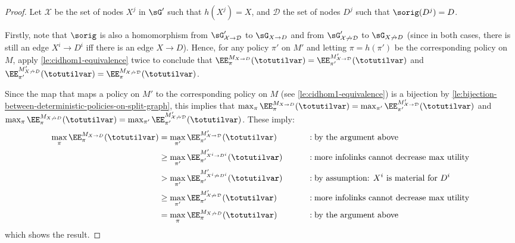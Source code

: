 \begin{proof}
\newcommand{\MatValue}[2]{\EE^{#2}_{#1}(\totutilvar)}
\newcommand{\maxMatValueExpanded}[3]{\max\limits_{#1}\MatValue{#2}{#3}}
\newcommand{\maxMatValueInlineExpanded}[3]{\max_{#1}\MatValue{#2}{#3}}
\newcommand{\maxMatValue}[2]{\maxMatValueExpanded{#1}{#1}{#2}}
\newcommand{\maxMatValueInline}[2]{\maxMatValueInlineExpanded{#1}{#1}{#2}}
Let $\mathcal X$ be the set of nodes $X^j$ in $\sG'$ such that $h(X^j)=X$, and $\mathcal D$ the set of nodes $D^j$ such that $\sorig(D^j)=D$. 

Firstly, note that $\sorig$ is also a homomorphism from  $\sG'_{\mathcal X\to \mathcal D}$ to $\sG_{X\to D}$ and from  $\sG'_{\mathcal X\not\to \mathcal D}$ to $\sG_{X\not\to D}$ (since in both cases, there is still an edge $X^i\to D^i$ iff there is an edge $X\to D$). Hence, for any policy $\pi'$ on $M'$ and letting $\pi=h(\pi')$ be the corresponding policy on $M$, apply \cref{le:cidhom1-equivalence} twice to conclude that 
$\MatValue{\pi}{M_{X\to D}}=\MatValue{\pi'}{M'_{\mathcal X\to \mathcal D}}$
and 
$\MatValue{\pi'}{M'_{X\not\to D}}=\MatValue{\pi}{M_{\mathcal X\not\to \mathcal D}}$.


Since the map that maps a policy on $M'$ to the corresponding policy on $M$ (see \cref{le:cidhom1-equivalence}) is a bijection by  \cref{le:bijection-between-deterministic-policies-on-split-graph}, this implies that 
$\maxMatValueInline{\pi}{M_{X\to D}}=\maxMatValueInline{\pi'}{M'_{\mathcal X\to \mathcal D}}$
and 
$\maxMatValueInline{\pi}{M_{X\not\to D}}=\maxMatValueInline{\pi'}{M'_{\mathcal X\not\to \mathcal D}}$.
These imply:
\begin{alignat*}{2}
    \maxMatValue{\pi}{M_{X\to D}} 
    &= \maxMatValue{\pi'}{M'_{\mathcal X\to \mathcal D}} \quad\quad &&: \text{by the argument above}\\
    &\geq \maxMatValue{\pi'}{M'_{X^i\to D^i}} \quad\quad &&: \text{more infolinks cannot decrease max utility}\\
    &> \maxMatValue{\pi'}{M'_{X^i\not\to D^i}} \quad &&:\text{by assumption: $X^i$ is material for $D^i$} \\
    &\geq 
    \maxMatValue{\pi'}{M'_{\mathcal X\not\to \mathcal D}} \quad &&:\text{more infolinks cannot decrease max utility} \\
    &= 
    \maxMatValue{\pi}{M_{X\not\to D}} \quad &&:\text{by the argument above}
\end{alignat*}
which shows the result.
\end{proof}































